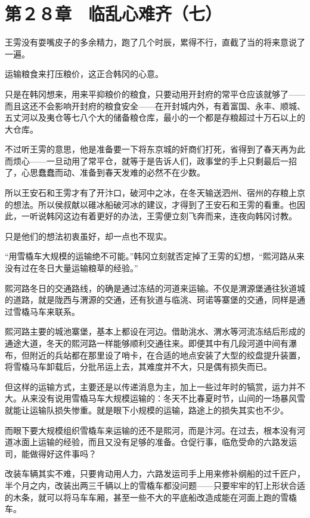 \section{第２８章　临乱心难齐（七）}

王雱没有耍嘴皮子的多余精力，跑了几个时辰，累得不行，直截了当的将来意说了一遍。

运输粮食来打压粮价，这正合韩冈的心意。

只是在韩冈想来，用来平抑粮价的粮食，只要动用开封府的常平仓应该就够了——而且这还不会影响开封府的粮食安全——在开封城内外，有着富国、永丰、顺城、五丈河以及夷仓等七八个大的储备粮仓库，最小的一个都是存粮超过十万石以上的大仓库。

不过听王雱的意思，他是准备要一下将东京城的奸商们打死，省得到了春天再为此而烦心——一旦动用了常平仓，就等于是告诉人们，政事堂的手上只剩最后一招了，心思蠢蠢而动、准备到春天发难的必然不在少数。

所以王安石和王雱才有了开汴口，破河中之冰，在冬天输送泗州、宿州的存粮上京的想法。所以侯叔献以碓冰船破河冰的建议，才得到了王安石和王雱的看重。也因此，一听说韩冈这边有着更好的办法，王雱便立刻飞奔而来，连夜向韩冈讨教。

只是他们的想法初衷虽好，却一点也不现实。

“用雪橇车大规模的运输绝不可能。”韩冈立刻就否定掉了王雱的幻想，“熙河路从来没有过在冬日大量运输粮草的经验。”

熙河路冬日的交通路线，的确是通过冻结的河道来运输。不仅是渭源堡通往狄道城的道路，就是陇西与渭源的交通，还有狄道与临洮、珂诺等寨堡的交通，同样是通过雪橇马车来联系。

熙河路主要的城池寨堡，基本上都设在河边。借助洮水、渭水等河流冻结后形成的通途大道，冬天的熙河路一样能够顺利交通往来。即便其中有几段河道中间有瀑布，但附近的兵站都在那里设了哨卡，在合适的地点安装了大型的绞盘提升装置，将雪橇马车卸载后，分批吊运上去，其难度并不大，只是偶有损失而已。

但这样的运输方式，主要还是以传递消息为主，加上一些过年时的犒赏，运力并不大。从来没有说用雪橇马车大规模运输的：冬天不比春夏时节，山间的一场暴风雪就能让运输队损失惨重。就是眼下小规模的运输，路途上的损失其实也不少。

而眼下要大规模组织雪橇车来运输的还不是熙河，而是汴河。在过去，根本没有河道冰面上运输的经验，而且又没有足够的准备。仓促行事，临危受命的六路发运司，能做得好这件事吗？

改装车辆其实不难，只要肯动用人力，六路发运司手上用来修补纲船的过千匠户，半个月之内，改装出两三千辆以上的雪橇车都没问题——只要牢牢的钉上形状合适的木条，就可以将马车车厢，甚至一些不大的平底船改造成能在河面上跑的雪橇车。

